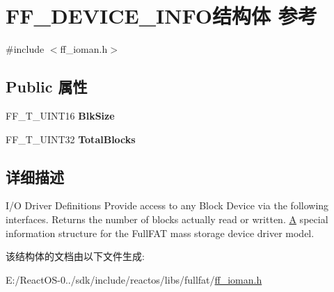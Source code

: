 \hypertarget{struct_f_f___d_e_v_i_c_e___i_n_f_o}{}\section{F\+F\+\_\+\+D\+E\+V\+I\+C\+E\+\_\+\+I\+N\+F\+O结构体 参考}
\label{struct_f_f___d_e_v_i_c_e___i_n_f_o}


{\ttfamily \#include $<$ff\+\_\+ioman.\+h$>$}

\subsection*{Public 属性}
\begin{DoxyCompactItemize}
\item 
\mbox{\label{struct_f_f___d_e_v_i_c_e___i_n_f_o_ab6e2651eb6473d5d3ded98a338bd340b}} 
F\+F\+\_\+\+T\+\_\+\+U\+I\+N\+T16 {\bfseries Blk\+Size}
\item 
\mbox{\label{struct_f_f___d_e_v_i_c_e___i_n_f_o_a9330fd7c9fccc1c9d41c51a8498a6dec}} 
F\+F\+\_\+\+T\+\_\+\+U\+I\+N\+T32 {\bfseries Total\+Blocks}
\end{DoxyCompactItemize}


\subsection{详细描述}
I/O Driver Definitions Provide access to any Block Device via the following interfaces. Returns the number of blocks actually read or written. \hyperlink{struct_a}{A} special information structure for the Full\+F\+AT mass storage device driver model. 

该结构体的文档由以下文件生成\+:\begin{DoxyCompactItemize}
\item 
E\+:/\+React\+O\+S-\/0../sdk/include/reactos/libs/fullfat/\hyperlink{ff__ioman_8h}{ff\+\_\+ioman.\+h}\end{DoxyCompactItemize}

